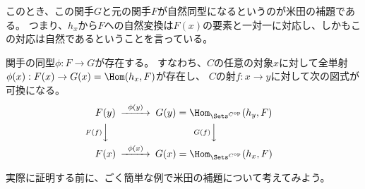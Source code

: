 \documentclass[uplatex]{jsarticle}
\begin{document}
このとき、この関手$G$と元の関手$F$が自然同型になるというのが米田の補題である。
つまり、$h_x$から$F$への自然変換は$F(x)$の要素と一対一に対応し、しかもこの対応は自然であるということを言っている。
\begin{thm}[米田の補題]
関手の同型$\phi:F\to G$が存在する。
すなわち、$C$の任意の対象$x$に対して全単射$\phi(x):F(x) \to G(x)=\Hom(h_x,F)$が存在し、
$C$の射$f:x \to y$に対して次の図式が可換になる。
\[
\begin{CD}
F(y)@>\phi(y)>>G(y)=\Hom_{\Sets^{C^{\rm op}}}(h_y,F)\\
@VF(f)VV@VG(f)VV\\
F(x)@>\phi(x)>>G(x)=\Hom_{\Sets^{C^{\rm op}}}(h_x,F)
\end{CD}
\]
\end{thm}

実際に証明する前に、ごく簡単な例で米田の補題について考えてみよう。
\end{document}
